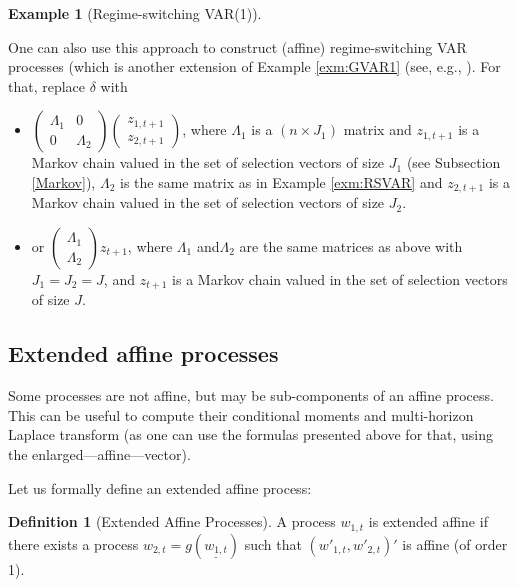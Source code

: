 \documentclass[
  12pt,
]{book}
\providecommand{\tightlist}{%
  \setlength{\itemsep}{0pt}\setlength{\parskip}{0pt}}
\theoremstyle{definition}
\newtheorem{definition}{Definition}[chapter]
\theoremstyle{definition}
\newtheorem{example}{Example}[chapter]
\theoremstyle{definition}
\theoremstyle{definition}
\theoremstyle{remark}
\begin{document}
\begin{example}[Regime-switching VAR(1)]
\protect\hypertarget{exm:RSVAR2}{}\label{exm:RSVAR2}

One can also use this approach to construct (affine) regime-switching VAR processes (which is another extension of Example \ref{exm:GVAR1} (see, e.g., \citet{Gourieroux_Monfort_Pegoraro_Renne_2014}). For that, replace \(\delta\) with

\begin{itemize}
\tightlist
\item
  \(\left( \begin{array}{ll} \Lambda_1 & 0 \\ 0 & \Lambda_2 \end{array} \right)\)\(\left( \begin{array}{l} z_{1,t+1} \\ z_{2,t+1} \end{array} \right)\), where \(\Lambda_1\) is a \((n \times J_1)\) matrix and \(z_{1,t+1}\) is a Markov chain valued in the set of selection vectors of size \(J_1\) (see Subsection \ref{Markov}), \(\Lambda_2\) is the same matrix as in Example \ref{exm:RSVAR} and \(z_{2,t+1}\) is a Markov chain valued in the set of selection vectors of size \(J_2\).
\item
  or \(\left( \begin{array}{l} \Lambda_1 \\ \Lambda_2 \end{array}\right)z_{t+1}\), where \(\Lambda_1\) and\(\Lambda_2\) are the same matrices as above with \(J_1=J_2=J\), and \(z_{t+1}\) is a Markov chain valued in the set of selection vectors of size \(J\).
\end{itemize}

\end{example}

\hypertarget{AffineExtended}{%
\subsection{Extended affine processes}\label{AffineExtended}}

Some processes are not affine, but may be sub-components of an affine process. This can be useful to compute their conditional moments and multi-horizon Laplace transform (as one can use the formulas presented above for that, using the enlarged---affine---vector).

Let us formally define an extended affine process:

\begin{definition}[Extended Affine Processes]
\protect\hypertarget{def:ExtAffine}{}\label{def:ExtAffine}A process \(w_{1,t}\) is extended affine if there exists a process \(w_{2,t} = g(\underline{w_{1,t}})\) such that \((w'_{1,t}, w'_{2,t})'\) is affine (of order 1).
\end{definition}
\end{document}
